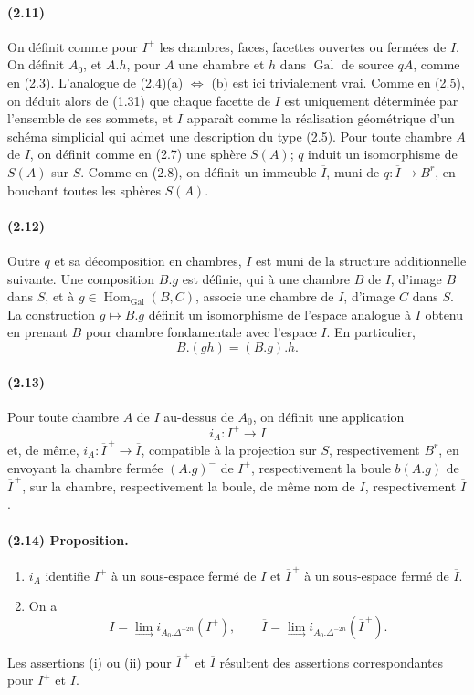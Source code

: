 \documentclass[10pt]{article}
\providecommand{\varinjlim}{\mathop{\mathrm{lim}}\limits_{\longrightarrow}}
\begin{document}
\paragraph{(2.11)} On définit comme pour \(I^+\) les chambres, faces, facettes ouvertes ou fermées de \(I\). On définit \(A_0\), et \(A.h\), pour \(A\) une chambre et \(h\) dans \(\operatorname{Gal}\) de source \(qA\), comme en (2.3). L'analogue de (2.4)(a) \(\Leftrightarrow\) (b) est ici trivialement vrai. Comme en (2.5), on déduit alors de (1.31) que chaque facette de \(I\) est uniquement déterminée par l'ensemble de ses sommets, et \(I\) apparaît comme la réalisation géométrique d'un schéma simplicial qui admet une description du type (2.5). Pour toute chambre \(A\) de \(I\), on définit comme en (2.7) une sphère \(S(A)\); \(q\) induit un isomorphisme de \(S(A)\) sur \(S\). Comme en (2.8), on définit un immeuble \(\overline I\), muni de \(q:\overline I\to B^r\), en bouchant toutes les sphères \(S(A)\).

\paragraph{(2.12)} Outre \(q\) et sa décomposition en chambres, \(I\) est muni de la structure additionnelle suivante. Une composition \(B.g\) est définie, qui à une chambre \(B\) de \(I\), d'image \(B\) dans \(S\), et à \(g\in\operatorname{Hom}_{\operatorname{Gal}}(B,C)\), associe une chambre de \(I\), d'image \(C\) dans \(S\). La construction \(g\mapsto B.g\) définit un isomorphisme de l'espace analogue à \(I\) obtenu en prenant \(B\) pour chambre fondamentale avec l'espace \(I\). En particulier,
\[
B.(gh)=(B.g).h.
\]

\paragraph{(2.13)} Pour toute chambre \(A\) de \(I\) au-dessus de \(A_0\), on définit une application
\[
i_A:I^+\longrightarrow I
\]
et, de même, \(i_A:\overline I^{\, +}\to\overline I\), compatible à la projection sur \(S\), respectivement \(B^r\), en envoyant la chambre fermée \((A.g)^{-}\) de \(I^+\), respectivement la boule \(b(A.g)\) de \(\overline I^{\, +}\), sur la chambre, respectivement la boule, de même nom de \(I\), respectivement \(\overline I\).

\paragraph{(2.14) Proposition.}
\begin{enumerate}[label=(\roman*)]
\item \(i_A\) identifie \(I^+\) à un sous-espace fermé de \(I\) et \(\overline I^{\, +}\) à un sous-espace fermé de \(\overline I\).
\item On a
\[
I=\varinjlim i_{A_0.\Delta^{-2n}}(I^+),
\qquad
\overline I=\varinjlim i_{A_0.\Delta^{-2n}}(\overline I^{\, +}).
\]
\end{enumerate}
Les assertions (i) ou (ii) pour \(\overline I^{\, +}\) et \(\overline I\) résultent des assertions correspondantes pour \(I^+\) et \(I\).
\end{document}
